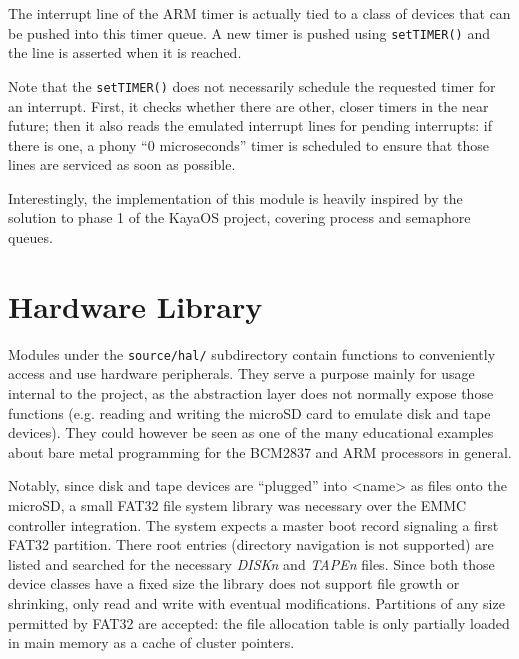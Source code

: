 \documentclass[12pt,a4paper,openright,twoside]{report}
\begin{document}
The interrupt line of the ARM timer is actually tied to a class of devices that
can be pushed into this timer queue. A new timer is pushed using {\tt setTIMER()}
and the line is asserted when it is reached.

Note that the {\tt setTIMER()} does not necessarily schedule the requested timer
for an interrupt. First, it checks whether there are other, closer timers
in the near future; then it also reads the emulated interrupt lines for pending
interrupts: if there is one, a phony ``0 microseconds'' timer is scheduled to 
ensure that those lines are serviced as soon as possible.

Interestingly, the implementation of this module is heavily inspired by the 
solution to phase 1 of the KayaOS project, covering process and semaphore queues.

\section{Hardware Library}
Modules under the {\tt source/hal/} subdirectory contain functions to conveniently access 
and use hardware peripherals. They serve a purpose mainly for usage internal to 
the project, as the abstraction layer does not normally expose those functions
(e.g. reading and writing the microSD card to emulate disk and tape devices).
They could however be seen as one of the many educational examples about 
bare metal programming for the BCM2837 and ARM processors in general.

Notably, since disk and tape devices are ``plugged'' into <name> as files onto
the microSD, a small FAT32 file system library was necessary over the EMMC controller
integration.
The system expects a master boot record signaling a first FAT32 partition. There
root entries (directory navigation is not supported) are listed and searched for
the necessary \textit{DISKn} and \textit{TAPEn} files. Since both those device
classes have a fixed size the library does not support file growth or shrinking,
only read and write with eventual modifications.
Partitions of any size permitted by FAT32 are accepted: the file allocation table
is only partially loaded in main memory as a cache of cluster pointers.
\end{document}
